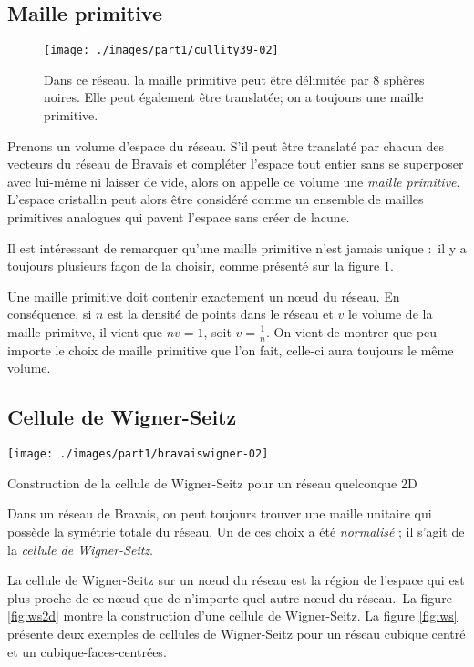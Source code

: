\subsection{Maille primitive}

\begin{figure}
    \texttt{[image: ./images/part1/cullity39-02]}
    \caption{Dans ce réseau, la maille primitive peut être délimitée par 8
    sphères noires. Elle peut également être translatée; on a toujours une maille
    primitive.}
    \label{fig:choixmaillespriv}
\end{figure}

Prenons un volume d'espace du réseau. S'il peut être translaté par chacun des vecteurs du réseau de Bravais et compléter l'espace tout entier sans se superposer avec lui-même ni laisser de vide, alors on appelle ce volume une \emph{maille primitive}.
L'espace cristallin peut alors être considéré comme un ensemble de mailles primitives analogues qui pavent l'espace sans créer de lacune.

Il est intéressant de remarquer qu'une maille primitive n'est jamais unique : il y a toujours plusieurs façon de la choisir, comme présenté sur la figure \ref{fig:choixmaillespriv}.

Une maille primitive doit contenir exactement un nœud du réseau. En conséquence, si $n$ est la densité de points dans le réseau et $v$ le volume de la maille primitve, il vient que $nv = 1$, soit $v = \frac{1}{n}$. On vient de montrer que peu importe le choix de maille primitive que l'on fait, celle-ci aura toujours le même volume.


\subsection{Cellule de Wigner-Seitz}

\begin{marginfigure}
    \texttt{[image: ./images/part1/bravaiswigner-02]}
    \caption{Construction de la cellule de Wigner-Seitz pour un réseau quelconque 2D}
    \label{fig:ws2d}
\end{marginfigure}

Dans un réseau de Bravais, on peut toujours trouver une maille unitaire qui possède la symétrie totale du réseau. Un de ces choix a été \emph{normalisé} ; il s'agit de la \emph{cellule de Wigner-Seitz}.

La cellule de Wigner-Seitz sur un nœud du réseau est la région de l'espace qui est plus proche de ce nœud que de n'importe quel autre nœud du réseau. La figure \ref{fig:ws2d} montre la construction d'une cellule de Wigner-Seitz. La figure \ref{fig:ws} présente deux exemples de cellules de Wigner-Seitz pour un réseau cubique centré et un cubique-faces-centrées.

